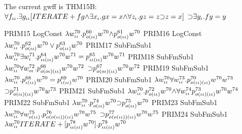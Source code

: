 \begin{tpsexample}
The current gwff is THM15B:
\(\forall f \sb{\iota\iota} . \exists g \sb{\iota\iota}  [ITERATE+ f g \mathord{\wedge}  \exists x \sb{\iota} .g x = x \mathord{\wedge}  \forall z \sb{\iota} .g z = z \mathord{\supset} z = x] \)
               \(\mathord{\supset}  \exists y \sb{\iota} .f y = y\)

     PRIM15   LogConst     \(\lambda w \sp{{70}}\sb{\iota\iota} .p \sp{{60}}\sb{o(\iota\iota)}  w \sp{{70}}  \mathord{\wedge} p \sp{{61}}\sb{o(\iota\iota)}  w \sp{{70}}\)
     PRIM16   LogConst     \(\lambda w \sp{{70}}\sb{\iota\iota} .p \sp{{62}}\sb{o(\iota\iota)}  w \sp{{70}}  \lor p \sp{{63}}\sb{o(\iota\iota)}  w \sp{{70}}\)
     PRIM17   SubFmSub1   \(\lambda w \sp{{70}}\sb{\iota\iota}   \exists w \sp{{71}}\sb{\iota} .p \sp{{64}}\sb{\iota\iota(\iota\iota)}  w \sp{{70}}  w \sp{{71}}  = p \sp{{65}}\sb{\iota\iota(\iota\iota)}  w \sp{{70}}  w \sp{{71}}\)
     PRIM18   SubFmSub1   \(\lambda w \sp{{70}}\sb{\iota\iota}   \forall w \sp{{72}}\sb{o\iota} .p \sp{{66}}\sb{o(o\iota)(\iota\iota)}  w \sp{{70}}  w \sp{{72}}  \)
               \(\mathord{\supset} p \sp{{67}}\sb{o(o\iota)(\iota\iota)}  w \sp{{70}}  w \sp{{72}}\)
     PRIM19   SubFmSub1   \(\lambda w \sp{{70}}\sb{\iota\iota} .p \sp{{68}}\sb{\iota(\iota\iota)}  w \sp{{70}}  = p \sp{{69}}\sb{\iota(\iota\iota)}  w \sp{{70}}\)
     PRIM20   SubFmSub1   \(\lambda w \sp{{70}}\sb{\iota\iota}   \forall w \sp{{73}}\sb{\iota\iota} .p \sp{{70}}\sb{o(\iota\iota)(\iota\iota)}  w \sp{{70}}  w \sp{{73}}  \)
               \(\mathord{\supset} p \sp{{71}}\sb{o(\iota\iota)(\iota\iota)}  w \sp{{70}}  w \sp{{73}}\)
     PRIM21   SubFmSub1   \(\lambda w \sp{{70}}\sb{\iota\iota} .p \sp{{72}}\sb{o(\iota\iota)}  w \sp{{70}}  \mathord{\wedge}  \forall w \sp{{74}}\sb{\iota\iota}  p \sp{{73}}\sb{o(\iota\iota)(\iota\iota)}  w \sp{{70}}  w \sp{{74}}\)
     PRIM22   SubFmSub1   \(\lambda w \sp{{70}}\sb{\iota\iota} .p \sp{{74}}\sb{o(\iota\iota)}  w \sp{{70}}  \mathord{\supset} p \sp{{75}}\sb{o(\iota\iota)}  w \sp{{70}}\)
     PRIM23   SubFmSub1   \(\lambda w \sp{{70}}\sb{\iota\iota}   \forall w \sp{{75}}\sb{o(\iota\iota)} .p \sp{{76}}\sb{o(o(\iota\iota))(\iota\iota)}  w \sp{{70}}  w \sp{{75}}  \)
               \(\mathord{\supset} p \sp{{77}}\sb{o(o(\iota\iota))(\iota\iota)}  w \sp{{70}}  w \sp{{75}}\)
     PRIM24   SubFmSub1   \(\lambda w \sp{{70}}\sb{\iota\iota}  ITERATE+ [p \sp{{78}}\sb{\iota\iota(\iota\iota)}  w \sp{{70}} ].p \sp{{79}}\sb{\iota\iota(\iota\iota)}  w \sp{{70}}\)

\end{tpsexample}
